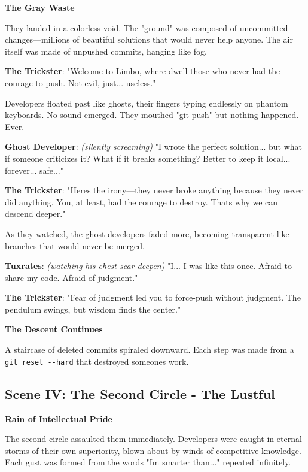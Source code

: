 \textbf{The Gray Waste}

They landed in a colorless void. The "ground" was composed of uncommitted changes---millions of beautiful solutions that would never help anyone. The air itself was made of unpushed commits, hanging like fog.

\textbf{The Trickster}: "Welcome to Limbo, where dwell those who never had the courage to push. Not evil, just... useless."

Developers floated past like ghosts, their fingers typing endlessly on phantom keyboards. No sound emerged. They mouthed "git push" but nothing happened. Ever.

\textbf{Ghost Developer}: \emph{(silently screaming)} "I wrote the perfect solution... but what if someone criticizes it? What if it breaks something? Better to keep it local... forever... safe..."

\textbf{The Trickster}: "Here\textquotesingle s the irony---they never broke anything because they never did anything. You, at least, had the courage to destroy. That\textquotesingle s why we can descend deeper."

As they watched, the ghost developers faded more, becoming transparent like branches that would never be merged.

\textbf{Tuxrates}: \emph{(watching his chest scar deepen)} "I... I was like this once. Afraid to share my code. Afraid of judgment."

\textbf{The Trickster}: "Fear of judgment led you to force-push without judgment. The pendulum swings, but wisdom finds the center."

\textbf{The Descent Continues}

A staircase of deleted commits spiraled downward. Each step was made from a \texttt{git\ reset\ -\/-hard} that destroyed someone\textquotesingle s work.

\bookdivider

\subsection{Scene IV: The Second Circle - The Lustful}\label{scene-iv-the-second-circle---the-lustful}

\textbf{Rain of Intellectual Pride}

The second circle assaulted them immediately. Developers were caught in eternal storms of their own superiority, blown about by winds of competitive knowledge. Each gust was formed from the words "I\textquotesingle m smarter than..." repeated infinitely.

